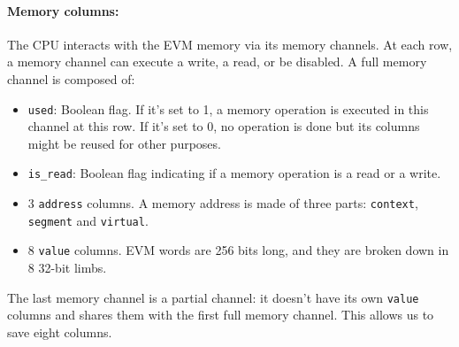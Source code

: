 \paragraph*{Memory columns:} The CPU interacts with the EVM memory via its memory channels. At each row, a memory channel can execute a write, a read, or be disabled. A full memory channel is composed of:
\begin{itemize}
    \item  \texttt{used}: Boolean flag. If it's set to 1, a memory operation is executed in this channel at this row. If it's set to 0, no operation is done but its columns might be reused for other purposes.
    \item  \texttt{is\_read}: Boolean flag indicating if a memory operation is a read or a write.
    \item  3 \texttt{address} columns. A memory address is made of three parts: \texttt{context}, \texttt{segment} and \texttt{virtual}.
    \item  8 \texttt{value} columns. EVM words are 256 bits long, and they are broken down in 8 32-bit limbs.
\end{itemize}
The last memory channel is a partial channel: it doesn't have its own \texttt{value} columns and shares them with the first full memory channel. This allows us to save eight columns.

